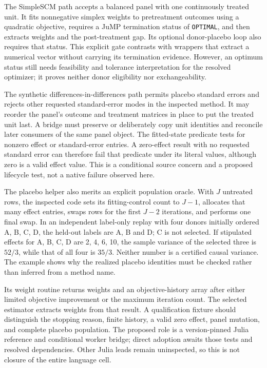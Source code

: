 The SimpleSCM path accepts a balanced panel with one continuously treated
unit. It fits nonnegative simplex weights to pretreatment outcomes using
a quadratic objective, requires a JuMP termination status of
\texttt{OPTIMAL}, and then extracts weights and the post-treatment gap.
Its optional donor-placebo loop also requires that status. This explicit
gate contrasts with wrappers that extract a numerical vector without
carrying its termination evidence. However, an optimum status still needs
feasibility and tolerance interpretation for the resolved optimizer;
it proves neither donor eligibility nor exchangeability.
\citep{exec25_synthcross_julia,exec25_synthcross_choice}

The synthetic differences-in-differences path permits placebo standard
errors and rejects other requested standard-error modes in the inspected
method. It may reorder the panel's outcome and treatment matrices in place
to put the treated unit last. A bridge must preserve or deliberately copy
unit identities and reconcile later consumers of the same panel object.
The fitted-state predicate tests for nonzero effect or standard-error
entries. A zero-effect result with no requested standard error can therefore
fail that predicate under its literal values, although zero is a valid
effect value. This is a conditional source concern and a proposed lifecycle
test, not a native failure observed here.~\citep{exec25_synthcross_julia}

The placebo helper also merits an explicit population oracle. With $J$
untreated rows, the inspected code sets its fitting-control count to $J-1$,
allocates that many effect entries, swaps rows for the first $J-2$ iterations,
and performs one final swap. In an independent label-only replay with four
donors initially ordered A, B, C, D, the held-out labels are A, B and D;
C is not selected. If stipulated effects for A, B, C, D are 2, 4, 6, 10,
the sample variance of the selected three is $52/3$, while that of all four
is $35/3$. Neither number is a certified causal variance. The example shows
why the realized placebo identities must be checked rather than inferred
from a method name.~\citep{exec25_synthcross_julia,exec25_synthcross_choice}

Its weight routine returns weights and an objective-history array after
either limited objective improvement or the maximum iteration count.
The selected estimator extracts weights from that result. A qualification
fixture should distinguish the stopping reason, finite history, a valid
zero effect, panel mutation, and complete placebo population. The proposed
role is a version-pinned Julia reference and conditional worker bridge;
direct adoption awaits those tests and resolved dependencies. Other Julia
leads remain uninspected, so this is not closure of the entire language cell.
\citep{exec25_synthcross_julia,exec25_synthcross_choice}


